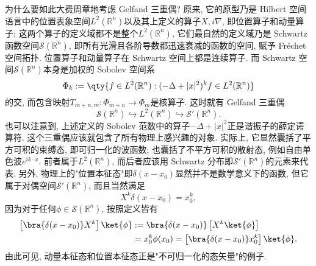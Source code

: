     为什么要如此大费周章地考虑 Gelfand 三重偶? 原来, 它的原型乃是 Hilbert 空间语言中的位置表象空间$L^2(\mathbb{R}^n)$以及其上定义的算子$X,i\nabla$, 即位置算子和动量算子; 这两个算子的定义域都不是整个$L^2(\mathbb{R}^n)$, 它们最自然的定义域乃是 Schwartz 函数空间$\mathcal{S}(\mathbb{R}^n)$, 即所有光滑且各阶导数都迅速衰减的函数的空间, 赋予 Fréchet 空间拓扑. 位置算子和动量算子在 Schwartz 空间上都是连续算子. 而 Schwartz 空间$\mathcal{S}(\mathbb{R}^n)$本身是加权的 Sobolev 空间系
$$
\Phi_k := \qty{f \in L^2 (\mathbb{R}^n): (-\Delta + |x|^ 2)^{k} f \in L^2 (\mathbb{R}^n) }
$$
的交, 而包含映射$T_{m+n,m}:\Phi_{m+n}\to\Phi_m$是核算子. 这时就有 Gelfand 三重偶$$
\mathcal{S}(\mathbb{R}^n)\hookrightarrow L^2(\mathbb{R}^n)\hookrightarrow \mathcal{S}'(\mathbb{R}^n).
$$也可以注意到, 上述定义的 Sobolev 范数中的算子$-\Delta+|x|^2$正是谐振子的薛定谔算符.
    这个三重偶应该就包含了所有物理上感兴趣的对象. 实际上, 它显然囊括了平方可积的束缚态, 即可归一化的波函数; 也囊括了不平方可积的散射态, 例如自由单色波$e^{ik\cdot x}$. 前者属于$L^2(\mathbb{R}^n)$, 而后者应该用 Schwartz 分布即$\mathcal{S}'(\mathbb{R}^n)$的元素来代表. 另外, 物理上的"位置本征态"即$\delta(x-x_0)$显然并不是数学意义下的函数, 但它属于对偶空间$\mathcal{S}'(\mathbb{R}^n)$, 而且当然满足
$$
X^k\delta(x-x_0)=x_0^k,
$$
因为对于任何$\phi\in\mathcal{S}(\mathbb{R}^n)$, 按照定义皆有
$$
\begin{aligned}
\left[\bra{\delta(x-x_0)}X^k\right]\ket{\phi}
&:=\bra{\delta(x-x_0)}\left[X^k\ket{\phi}\right]\\
&=x_0^k\phi(x_0)
=\left[\bra{\delta(x-x_0)}x_0^k\right]\ket{\phi}.
\end{aligned}
$$
由此可见, 动量本征态和位置本征态正是"不可归一化的态矢量"的例子.